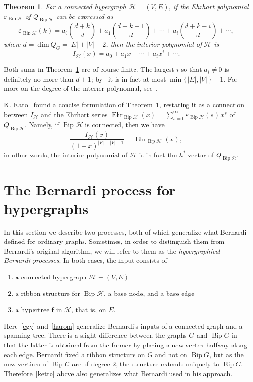 \documentclass[10pt]{amsart}
\newtheorem{theo}{Theorem}[section]
\theoremstyle{definition}\newtheorem{defi}[theo]{Definition}
\theoremstyle{remark}\newtheorem{rema}[theo]{Remark}
\newcommand{\HH}{\mathcal H}
\DeclareMathOperator{\bip}{Bip}
\DeclareMathOperator{\Ehr}{Ehr}
\begin{document}
\begin{theo}
\label{t:interior_poly_ehrhart_h-vector}
For a connected hypergraph $\HH=(V,E)$, if the Ehrhart polynomial $\varepsilon_{\bip \HH}$ of $Q_{\bip \HH}$ can be expressed as 
\begin{equation*}
\varepsilon_{\bip \HH}(k)=a_0\binom{d+k}{d}+a_1\binom{d+k-1}{d}+\cdots+a_i\binom{d+k-i}{d}+\cdots,
\end{equation*}
where $d=\dim Q_G=|E|+|V|-2$, then the interior polynomial of $\HH$ is 
\[I_{\HH}(x)=a_0+a_1x+\cdots+a_ix^i+\cdots.\]
\end{theo}

Both sums in Theorem~\ref{t:interior_poly_ehrhart_h-vector} are of course finite. The largest $i$ so that $a_i\ne0$ is definitely no more than $d+1$; by~\cite[Proposition~6.1]{hiperTutte} it is in fact at most $\min\{\,|E|,|V|\,\}-1$. For more on the degree of the interior polynomial, see~\cite{Frank-K}.

K. Kato~\cite{Kato} found a concise formulation of Theorem~\ref{t:interior_poly_ehrhart_h-vector}, restating it as a connection between $I_\HH$ and the Ehrhart series $\Ehr_{\bip \HH}(x)=\sum_{s=0}^\infty\varepsilon_{\bip \HH}(s)\,x^s$ of $Q_{\bip\HH}$. Namely, if $\bip\HH$ is connected, then we have
\[\frac{I_\HH(x)}{(1-x)^{|E|+|V|-1}}=\Ehr _{\bip \HH}(x),\]
in other words, the interior polynomial of $\HH$ is in fact the $h^*$-vector of $Q_{\bip\HH}$.


\section{The Bernardi process for hypergraphs}
\label{sec:Bernardi-process}

In this section we describe two 
processes, both of which generalize what Bernardi defined for ordinary graphs. Sometimes, in order to distinguish them from Bernardi's original algorithm, we will refer to them as the \emph{hypergraphical Bernardi processes}. In both cases, the input consists of 
\begin{enumerate}[label=(\alph*)]
\item\label{egy} a connected hypergraph $\HH=(V,E)$
\item\label{ketto} a ribbon structure for $\bip\HH$, a base node, and a base edge
\item\label{harom} a hypertree $\mathbf f$ in $\HH$, that is, on $E$.
\end{enumerate}
Here~\ref{egy} and~\ref{harom} generalize Bernardi's inputs of a connected graph and a spanning tree. There is a slight difference between the graphs $G$ and $\bip G$ in that the latter is obtained from the former by placing a new vertex halfway along each edge. Bernardi fixed a ribbon structure on $G$ and not on $\bip G$, but as the new vertices of $\bip G$ are of degree $2$, the structure extends uniquely to $\bip G$. Therefore~\ref{ketto} above also generalizes what Bernardi used in his approach.
 
\end{document}
